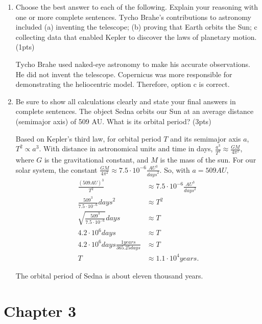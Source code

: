 \documentclass{article}
\begin{document}
\begin{enumerate}[start=9]
    \item Choose the best answer to each of the following. Explain your reasoning with one or more complete sentences. Tycho Brahe’s contributions to astronomy included 
    (a) inventing the telescope; 
    (b) proving that Earth orbits the Sun; 
    \textcircled{c} collecting data that enabled Kepler to discover the laws of planetary motion. (1pts)
    
    Tycho Brahe used naked-eye astronomy to make his accurate observations. He did not invent the telescope.
    Copernicus was more responsible for demonstrating the heliocentric model.
    Therefore, option c is correct.

    \item Be sure to show all calculations clearly and state your final answers in complete sentences. 
    The object Sedna orbits our Sun at an average distance (semimajor axis) of 509 AU.
    What is its orbital period? (3pts)

    Based on Kepler’s third law, for orbital period $T$ and its semimajor axis $a$, $T^2 \propto a^3$. With distance in astronomical units and time in days, $\frac{a^3}{T^2} \approx \frac{GM}{4\pi^2}$, where $G$ is the gravitational constant, and $M$ is the mass of the sun. For our solar system, the constant $\frac{GM}{4\pi^2} \approx 7.5 \cdot 10^{-6} \frac{\si{AU}^3}{\si{days}^2}$.
    So, with $a = 509 \si{AU}$,
    \begin{align*}
        \frac{{(509 \si{ AU})}^3}{T^2} &\approx 7.5 \cdot 10^{-6} \frac{\si{ AU}^3}{\si{ days}^2} \\
        \frac{509^3}{7.5 \cdot 10^{-6}} \si{ days}^2 &\approx T^2 \\
        \sqrt{\frac{509^3}{7.5 \cdot 10^{-6}}} \si{ days} &\approx T \\
        4.2 \cdot 10^6 \si{ days} &\approx T \\
        4.2 \cdot 10^6 \si{ days} \frac{1 \si{ years}}{365.25 \si{ days}} &\approx T \\
        T &\approx 1.1 \cdot 10^4 \si{ years}.
    \end{align*}

    The orbital period of Sedna is about eleven thousand years.

\end{enumerate}


\section*{Chapter 3}
\end{document}
